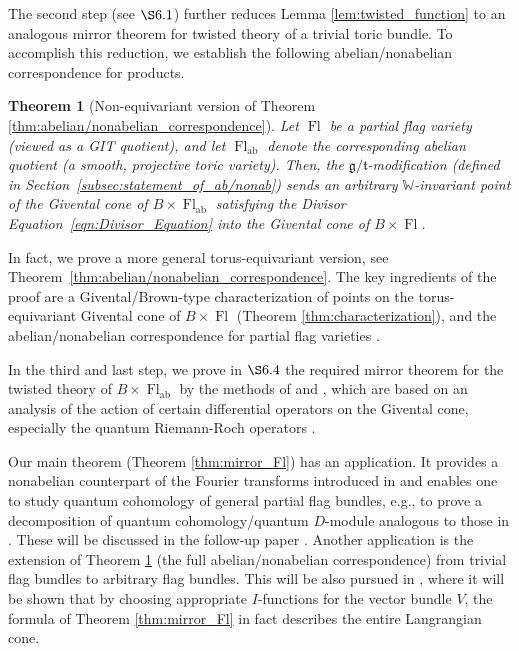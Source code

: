 \documentclass[a4paper,12pt]{amsart}
\numberwithin{equation}{section}
\newtheorem{theorem}{Theorem}[section]
\theoremstyle{definition}
\newcommand{\W}{\mathbb{W}}
\newcommand{\gt}{{\mathfrak{g}/\mathfrak{t}}}
\newcommand{\FlG}{\operatorname{Fl}}
\newcommand{\FlT}{\operatorname{Fl}_{\operatorname{ab}}}
\begin{document}
The second step (see $\S 6.1$) further reduces Lemma \ref{lem:twisted_function} to an analogous mirror theorem for twisted theory of a trivial toric bundle. To accomplish this reduction, we establish the following abelian/nonabelian correspondence for products.

\begin{theorem}[Non-equivariant version of Theorem \ref{thm:abelian/nonabelian_correspondence}]\label{thm:intro_ab/nonab}
    Let $\FlG$ be a partial flag variety (viewed as a GIT quotient), and let $\FlT$ denote the corresponding abelian quotient (a smooth, projective toric variety).
    Then, the $\gt$-modification (defined in Section~\ref{subsec:statement_of_ab/nonab}) sends an arbitrary $\W$-invariant point of the Givental cone of $B\times\FlT$ satisfying the Divisor Equation~\eqref{eqn:Divisor_Equation} into the Givental cone of $B\times\FlG$.
\end{theorem}

In fact, we prove a more general torus-equivariant version, see Theorem~\ref{thm:abelian/nonabelian_correspondence}.
The key ingredients of the proof are a Givental/Brown-type characterization of points on the torus-equivariant Givental cone of $B\times\FlG$ (Theorem \ref{thm:characterization}), and the abelian/nonabelian correspondence for partial flag varieties \cite{CFKS}.

In the third and last step, we prove in $\S 6.4$ the required mirror theorem for the twisted theory of $B\times\FlT$ by the methods of \cite{IK:quantum} and \cite{Koto:mirror}, which are based on an analysis of the action of certain differential operators on the Givental cone, especially the quantum Riemann-Roch operators \cite{CG:quantum}.



Our main theorem (Theorem \ref{thm:mirror_Fl}) has an application.
It provides a nonabelian counterpart of the Fourier transforms introduced in \cite{IK:quantum,Iritani:blowups} and enables one to study quantum cohomology of general partial flag bundles, e.g., to prove a decomposition of quantum cohomology/quantum $D$-module analogous to those in \cite{IK:quantum,Iritani:blowups}. These will be discussed in the follow-up paper \cite{Koto:GIT}. Another application is the extension of Theorem \ref{thm:intro_ab/nonab} (the full abelian/nonabelian correspondence) from trivial flag bundles to arbitrary flag bundles. This will be also pursued in \cite{Koto:GIT}, where it will be shown that by choosing appropriate $I$-functions for the vector bundle $V$, the formula of Theorem \ref{thm:mirror_Fl} in fact describes the entire Langrangian cone.
\end{document}
